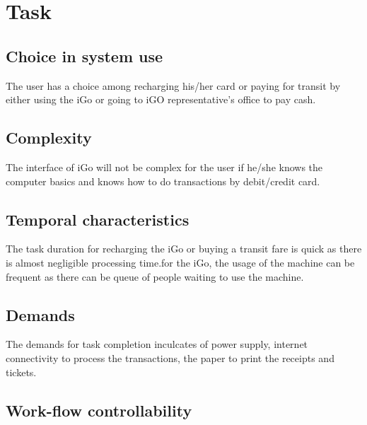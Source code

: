 \documentclass[12pt]{report}
\begin{document}
\vspace{\baselineskip}
\section{Task}

\subsection{Choice in system use}

The user has a choice among recharging his/her card or paying for transit by either using the iGo or going to iGO representative's office to pay cash.\par


\vspace{\baselineskip}
\subsection{Complexity}

The interface of iGo will not be complex for the user if he/she knows the computer basics and knows how to do transactions by debit/credit card.\par


\vspace{\baselineskip}
\subsection{Temporal characteristics}

The task duration for recharging the iGo or buying a transit fare is quick as there is almost negligible processing time.for the iGo, the usage of the machine can be frequent as there can be queue of people waiting to use the machine.\par

\subsection{Demands}

The demands for task completion inculcates of power supply, internet connectivity to process the transactions, the paper to print the receipts and tickets.\par



\vspace{\baselineskip}
\subsection{Work-flow controllability}
\end{document}
